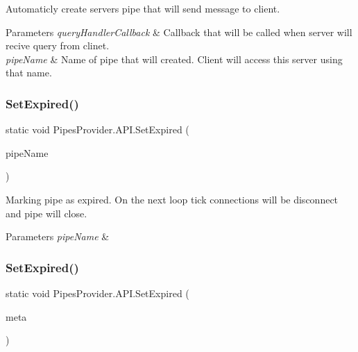 Automaticly create server\textquotesingle{}s pipe that will send message to client. 


\begin{DoxyParams}{Parameters}
{\em query\+Handler\+Callback} & Callback that will be called when server will recive query from clinet.\\
\hline
{\em pipe\+Name} & Name of pipe that will created. Client will access this server using that name.\\
\hline
\end{DoxyParams}
\mbox{\label{class_pipes_provider_1_1_a_p_i_ab525aaa0c87f23cfbe4ad6d0ed1b1b4c}} 
\subsubsection{\texorpdfstring{Set\+Expired()}{SetExpired()}\hspace{0.1cm}{\footnotesize\ttfamily [1/2]}}
{\footnotesize\ttfamily static void Pipes\+Provider.\+A\+P\+I.\+Set\+Expired (\begin{DoxyParamCaption}\item[{string}]{pipe\+Name }\end{DoxyParamCaption})\hspace{0.3cm}{\ttfamily [static]}}



Marking pipe as expired. On the next loop tick connections will be disconnect and pipe will close. 


\begin{DoxyParams}{Parameters}
{\em pipe\+Name} & \\
\hline
\end{DoxyParams}
\mbox{\label{class_pipes_provider_1_1_a_p_i_a9bfed3a9b5733c6a76235ec096c903e3}} 
\subsubsection{\texorpdfstring{Set\+Expired()}{SetExpired()}\hspace{0.1cm}{\footnotesize\ttfamily [2/2]}}
{\footnotesize\ttfamily static void Pipes\+Provider.\+A\+P\+I.\+Set\+Expired (\begin{DoxyParamCaption}\item[{\mbox{\hyperlink{class_pipes_provider_1_1_server_transmission_meta}{Server\+Transmission\+Meta}}}]{meta }\end{DoxyParamCaption})\hspace{0.3cm}{\ttfamily [static]}}



